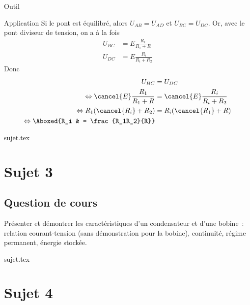 \documentclass[a4paper, 11pt]{book}
\begin{document}
{\begin{tcbraster}[raster columns=6, raster equal height=rows]
\begin{tcolorbox}[blankest, raster multicolumn=1, space to=\myspace]
\begin{tcbraster}[raster columns=1]
\begin{NCrapp}{Outil}
                \end{NCrapp}
            \end{tcbraster}
        \end{tcolorbox}
        \begin{NCexem}[raster multicolumn=3]{Application} Si le pont est
            équilibré, alors $U_{AB} = U_{AD}$ et $U_{BC} = U_{DC}$. Or, avec le
            pont diviseur de tension, on a à la fois
            \begin{align*}
                U_{BC} & = E \frac{R_1}{R_1+R}\\
                U_{DC} & = E \frac{R_i}{R_i+R_2}
            \end{align*}
            Donc
            \begin{align*}
                U_{BC} &= U_{DC}\\
                \Leftrightarrow \cancel{E} \frac{R_1}{R_1+R}
                       & = \cancel{E} \frac{R_i}{R_i+R_2}\\
                \Leftrightarrow R_1(\cancel{R_i}+R_2) & = R_i(\cancel{R_1}+R)\\
                \Leftrightarrow \Aboxed{R_i & = \frac{R_1R_2}{R}}
            \end{align*}
        \end{NCexem}
    \end{tcbraster}
}

\resetQ

{sujet.tex}

\resetQ
\newpage

\chapter{Sujet 3}
\section{Question de cours}

Présenter et démontrer les caractéristiques d'un condensateur et d'une bobine~:
relation courant-tension (sans démonstration pour la bobine), continuité, régime
permanent, énergie stockée.

{sujet.tex}

\resetQ
\newpage

\chapter{Sujet 4}
\end{document}
